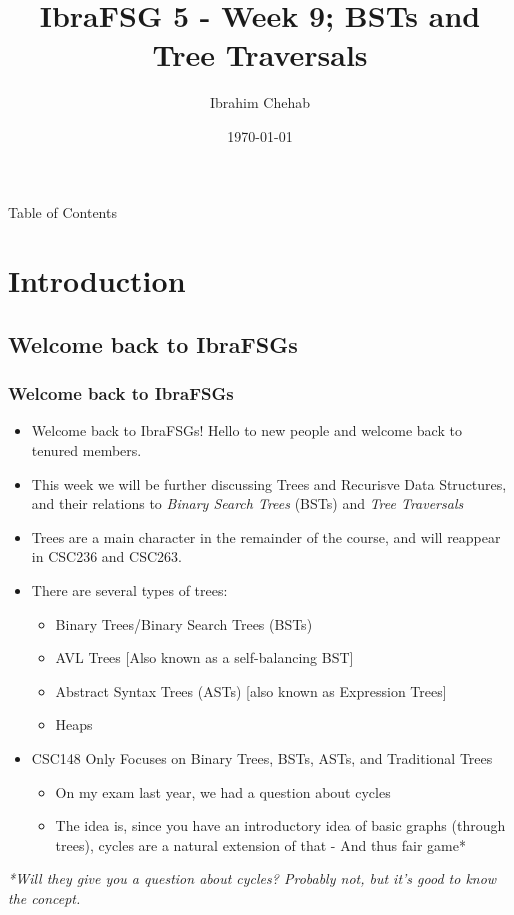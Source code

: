 \documentclass[hyperref={colorlinks,citecolor=blue,linkcolor=blue,urlcolor=blue}, aspectratio=1610]{beamer}
\title[IbraFSG 5: BSTs and Tree Traversals]{IbraFSG\texttrademark{} 5 - Week 9; BSTs and Tree Traversals}
\author{Ibrahim Chehab}
\institute{UTM RGASC}
\date{\today}
\begin{document}
\begin{frame}
  \titlepage
\end{frame}

\begin{frame}{Table of Contents}
  \tableofcontents
\end{frame}

\section{Introduction}

\subsection{Welcome back to IbraFSGs\texttrademark{}}
\begin{frame}
  \frametitle{Welcome back to IbraFSGs\texttrademark{}}
  \begin{itemize}
  \item Welcome back to IbraFSGs\texttrademark{}! Hello to new people and welcome back to tenured members.
  \item This week we will be further discussing Trees and Recurisve Data Structures, and their relations to \textit{Binary Search Trees} (BSTs) and \textit{Tree Traversals}
  \item Trees are a main character in the remainder of the course, and will reappear in CSC236 and CSC263.
  \item There are several types of trees:
  \begin{itemize}
    \item Binary Trees/Binary Search Trees (BSTs)
    \item AVL Trees [Also known as a self-balancing BST]
    \item Abstract Syntax Trees (ASTs) [also known as Expression Trees]
    \item Heaps
  \end{itemize}
  \item CSC148 Only Focuses on Binary Trees, BSTs, ASTs, and Traditional Trees
  \begin{itemize}
    \item On my exam last year, we had a question about cycles 
    \item The idea is, since you have an introductory idea of basic graphs (through trees), cycles are a natural extension of that - And thus fair game*
  \end{itemize}
\end{itemize}
\small{\textit{*Will they give you a question about cycles? Probably not, but it's good to know the concept.}}
\end{frame}
\end{document}
